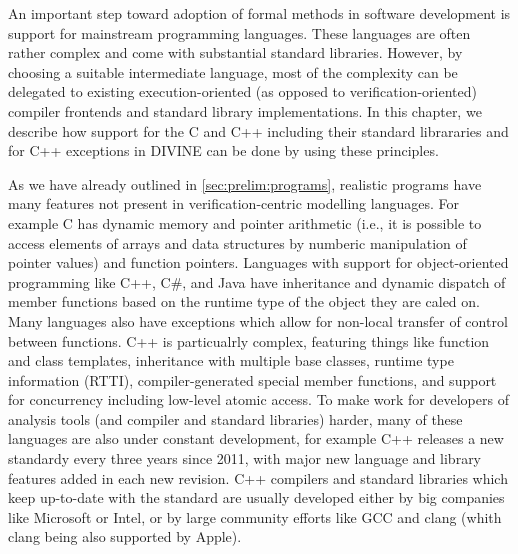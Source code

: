 
\bigskip\noindent
An important step toward adoption of formal methods in software development is
support for mainstream programming languages.
These languages are often rather complex and come with substantial standard
libraries.
However, by choosing a suitable intermediate language, most of the complexity
can be delegated to existing execution-oriented (as opposed to
verification-oriented) compiler frontends and standard library implementations.
In this chapter, we describe how support for the C and C++ including their
standard librararies and for C++ exceptions in DIVINE can be done by using
these principles.


As we have already outlined in \autoref{sec:prelim:programs}, realistic
programs have many features not present in verification-centric modelling
languages.
For example C has dynamic memory and pointer arithmetic (i.e., it is possible
to access elements of arrays and data structures by numberic manipulation of
pointer values) and function pointers.
Languages with support for object-oriented programming like C++, C\#, and Java
have inheritance and dynamic dispatch of member functions based on the runtime
type of the object they are caled on.
Many languages also have exceptions which allow for non-local transfer of
control between functions.
C++ is particualrly complex, featuring things like function and class
templates,
inheritance with multiple base classes, runtime type information (RTTI),
compiler-generated special member functions,
and support for concurrency including low-level atomic access.
To make work for developers of analysis tools (and compiler and standard
libraries) harder, many of these languages are also under constant development,
for example C++ releases a new standardy every three years since 2011, with
major new language and library features added in each new revision.
C++ compilers and standard libraries which keep up-to-date with the standard
are usually developed either by big companies like Microsoft or Intel, or by
large community efforts like GCC and clang (whith clang being also supported by
Apple).

